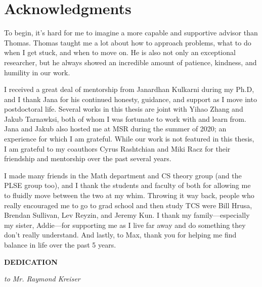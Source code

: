 \documentclass[12pt]{book}
\theoremstyle{theorem}
\theoremstyle{remark}
\theoremstyle{definition}
\theoremstyle{plain}
\theoremstyle{plain}
\theoremstyle{plain}
\theoremstyle{definition}
\theoremstyle{theorem}
\begin{document}
\begin{spacing}{1.5}
  \tableofcontents
\end{spacing}

\chapter*{Acknowledgments}

To begin, it's hard for me to imagine a more capable and supportive advisor than Thomas. 
Thomas taught me a lot about how to approach problems, what to do when I get stuck, and when to move on.
He is also not only an exceptional researcher, but he always showed an incredible amount of patience, kindness, and humility in our work. 

I received a great deal of mentorship from Janardhan Kulkarni during my Ph.D, and I thank Jana for his continued 
honesty, guidance, and support as I move into postdoctoral life.
Several works in this thesis are joint with Yihao Zhang and Jakub Tarnawksi, both of whom I was fortunate to work with and learn from.
Jana and Jakub also hosted me at MSR during the summer of 2020; an experience for which I am grateful.
While our work is not featured in this thesis, I am grateful to my coauthors Cyrus Rashtchian and Miki Racz 
for their friendship and mentorship over the past several years.


I made many friends in the Math department and CS theory group (and the PLSE group too), and I thank the students and faculty of both 
for allowing me to fluidly move between the two at my whim. 
Throwing it way back, people who really encouraged me to go to grad school and then study TCS were
Bill Hrusa, Brendan Sullivan, Lev Reyzin, and Jeremy Kun.
I thank my family---especially my sister, Addie---for supporting me as I live far away and do something they don't really understand.
And lastly, to Max, thank you for helping me find balance in life over the past 5 years.


\begin{center}
    \textbf{DEDICATION}


\emph{to Mr. Raymond Kreiser}


\end{center}




\clearpage

\pagestyle{headings}
\setcounter{page}{1}
\renewcommand{\chaptermark}[1]{\markboth{\sc{\chaptername\ \thechapter.\ #1}}{}}
\renewcommand{\sectionmark}[1]{\markright{\sc{\thesection.\ #1}}{}}





\clearpage
{}
\singlespacing


\end{document}
